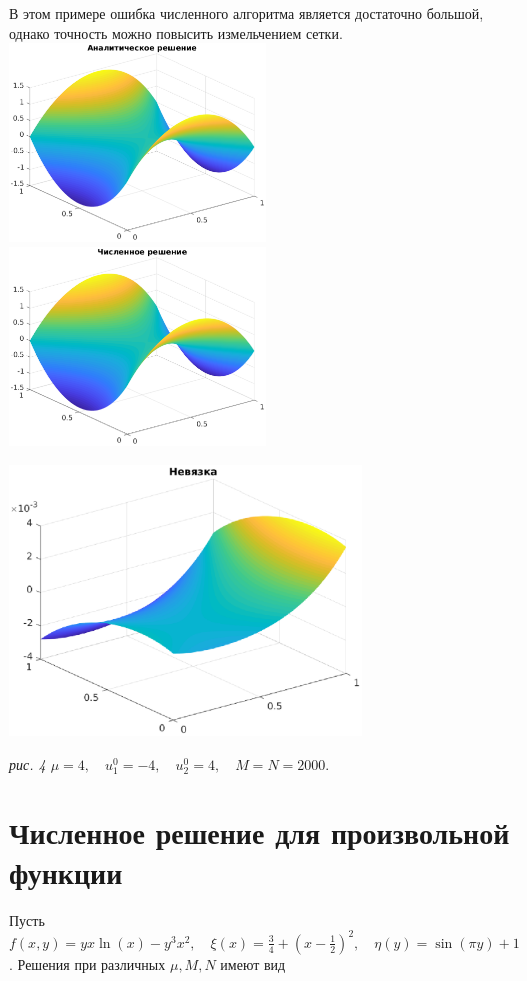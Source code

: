 \documentclass[11pt]{article}
\begin{document}
В этом примере ошибка численного алгоритма является достаточно большой, однако точность можно повысить измельчением сетки.
\newpage
\noindent
\includegraphics[width=0.51\textwidth]{sol_a_4.eps}
\includegraphics[width=0.51\textwidth]{sol_n_4.eps}
\begin{center}
\includegraphics[width=0.7\textwidth]{resid4.eps}

\it{рис. 4 \quad $\mu = 4, \quad u_1^0 = -4, \quad u_2^0 = 4, \quad M = N = 2000.$}
\end{center}

\newpage
\section{Численное решение для произвольной функции}
Пусть $f(x, y) = yx\ln(x) - y^3x^2, \quad \xi(x) = \frac{3}{4}+\left(x-\frac{1}{2}\right)^2, \quad \eta(y) = \sin(\pi y) + 1$. Решения при различных $\mu, M, N$ имеют вид
\end{document}
